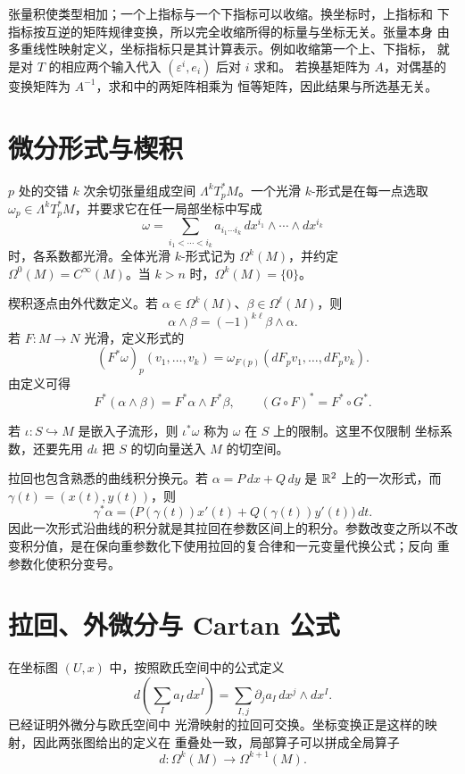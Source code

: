 张量积使类型相加；一个上指标与一个下指标可以收缩。换坐标时，上指标和
下指标按互逆的矩阵规律变换，所以完全收缩所得的标量与坐标无关。张量本身
由多重线性映射定义，坐标指标只是其计算表示。例如收缩第一个上、下指标，
就是对 $T$ 的相应两个输入代入 $(\varepsilon^i,e_i)$ 后对 $i$ 求和。
若换基矩阵为 $A$，对偶基的变换矩阵为 $A^{-1}$，求和中的两矩阵相乘为
恒等矩阵，因此结果与所选基无关。

\section{微分形式与楔积}

\(p\) 处的交错 \(k\) 次余切张量组成空间
\(\Lambda^kT_p^*M\)。一个光滑 \(k\)-形式是在每一点选取
\(\omega_p\in\Lambda^kT_p^*M\)，并要求它在任一局部坐标中写成
\[
 \omega=\sum_{i_1<\cdots<i_k}
 a_{i_1\cdots i_k}\,
 dx^{i_1}\wedge\cdots\wedge dx^{i_k}
\]
时，各系数都光滑。全体光滑 \(k\)-形式记为 \(\Omega^k(M)\)，并约定
\(\Omega^0(M)=C^\infty(M)\)。当 \(k>n\) 时，\(\Omega^k(M)=\{0\}\)。

楔积逐点由外代数定义。若
\(\alpha\in\Omega^k(M)\)、\(\beta\in\Omega^\ell(M)\)，则
\[
 \alpha\wedge\beta=(-1)^{k\ell}\beta\wedge\alpha.
\]
若 \(F:M\to N\) 光滑，定义形式的
\[
 (F^*\omega)_p(v_1,\ldots,v_k)
 =\omega_{F(p)}(dF_pv_1,\ldots,dF_pv_k).
\]
由定义可得
\[
 F^*(\alpha\wedge\beta)=F^*\alpha\wedge F^*\beta,
 \qquad (G\circ F)^*=F^*\circ G^*.
\]

若 \(\iota:S\hookrightarrow M\) 是嵌入子流形，则
\(\iota^*\omega\) 称为 \(\omega\) 在 \(S\) 上的限制。这里不仅限制
坐标系数，还要先用 \(d\iota\) 把 \(S\) 的切向量送入 \(M\) 的切空间。

拉回也包含熟悉的曲线积分换元。若
\(\alpha=P\,dx+Q\,dy\) 是 \(\mathbb{R}^2\) 上的一次形式，而
\(\gamma(t)=(x(t),y(t))\)，则
\[
 \gamma^*\alpha
 =\bigl(P(\gamma(t))x'(t)+Q(\gamma(t))y'(t)\bigr)\,dt.
\]
因此一次形式沿曲线的积分就是其拉回在参数区间上的积分。参数改变之所以不改
变积分值，是在保向重参数化下使用拉回的复合律和一元变量代换公式；反向
重参数化使积分变号。

\section{拉回、外微分与 Cartan 公式}

在坐标图 \((U,x)\) 中，按照欧氏空间中的公式定义
\[
 d\left(\sum_Ia_I\,dx^I\right)
 =\sum_{I,j}\partial_ja_I\,dx^j\wedge dx^I.
\]
已经证明外微分与欧氏空间中
光滑映射的拉回可交换。坐标变换正是这样的映射，因此两张图给出的定义在
重叠处一致，局部算子可以拼成全局算子
\[
 d:\Omega^k(M)\longrightarrow\Omega^{k+1}(M).
\]

